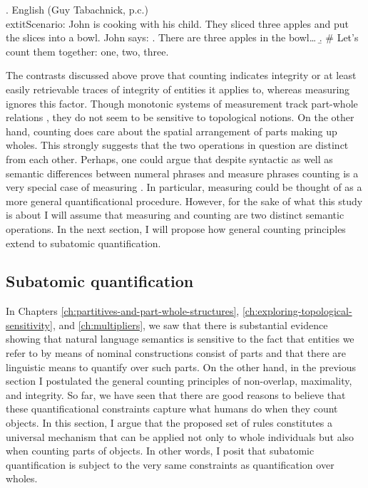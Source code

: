 \ex. English (Guy Tabachnick, p.c.)\\
	extit{Scenario}: John is cooking with his child. They sliced three apples and put the slices into a bowl. John says:\label{ex:cooking-measuring}
\a. There are three apples in the bowl\dots\label{ex:cooking-measuring-setup}
\b. \# Let's count them together: one, two, three.\label{ex:cooking-measuring-continuation}

The contrasts discussed above prove that counting indicates integrity or at least easily retrievable traces of integrity of entities it applies to, whereas measuring ignores this factor. Though monotonic systems of measurement track part-whole relations \citep{schwarzschild2002grammar}, they do not seem to be sensitive to topological notions. On the other hand, counting does care about the spatial arrangement of parts making up wholes. This strongly suggests that the two operations in question are distinct from each other. Perhaps, one could argue that despite syntactic as well as semantic differences between numeral phrases and measure phrases \citep[see][]{rothstein2017semantics} counting is a very special case of measuring \citep[see][]{krifka1989nominal,krifka1995common}. In particular, measuring could be thought of as a more general quantificational procedure.  However, for the sake of what this study is about I will assume that measuring and counting are two distinct semantic operations. In the next section, I will propose how general counting principles extend to subatomic quantification.

\subsection{Subatomic quantification}\label{sec:subatomic-quantification}

In Chapters \ref{ch:partitives-and-part-whole-structures}, \ref{ch:exploring-topological-sensitivity}, and \ref{ch:multipliers}, we saw that there is substantial evidence showing that natural language semantics is sensitive to the fact that entities we refer to by means of nominal constructions consist of parts and that there are linguistic means to quantify over such parts. On the other hand, in the previous section I postulated the general counting principles of non-overlap, maximality, and integrity. So far, we have seen that there are good reasons to believe that these quantificational constraints capture what humans do when they count objects. In this section, I argue that the proposed set of rules constitutes a universal mechanism that can be applied not only to whole individuals but also when counting parts of objects. In other words, I posit that subatomic quantification is subject to the very same constraints as quantification over wholes.

